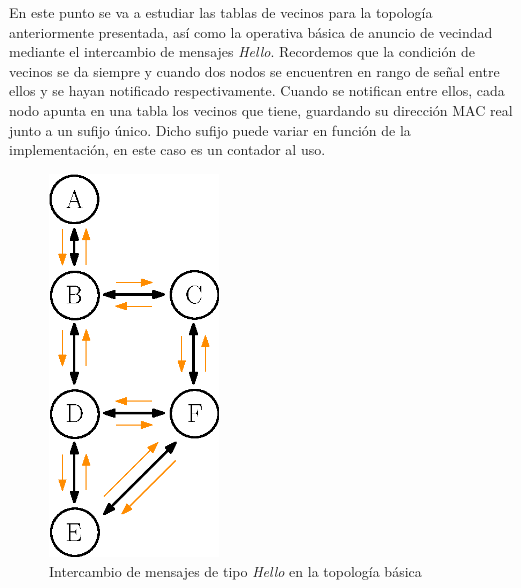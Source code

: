 En este punto se va a estudiar las tablas de vecinos para la topología anteriormente presentada, así como la operativa básica de anuncio de vecindad mediante el intercambio de mensajes \textit{Hello}. Recordemos que la condición de vecinos se da siempre y cuando dos nodos se encuentren en rango de señal entre ellos y se hayan notificado respectivamente. Cuando se notifican entre ellos, cada nodo apunta en una tabla los vecinos que tiene, guardando su dirección MAC real junto a un sufijo único. Dicho sufijo puede variar en función de la implementación, en este caso es un contador al uso.\\


\begin{figure}[ht]
    \centering
    \includegraphics[width=0.4\textwidth]{archivos/img/dev/topo_hellos.eps}
    \caption{Intercambio de mensajes de tipo \textit{Hello} en la topología básica}
    \label{fig:topo_hellos}
\end{figure}

